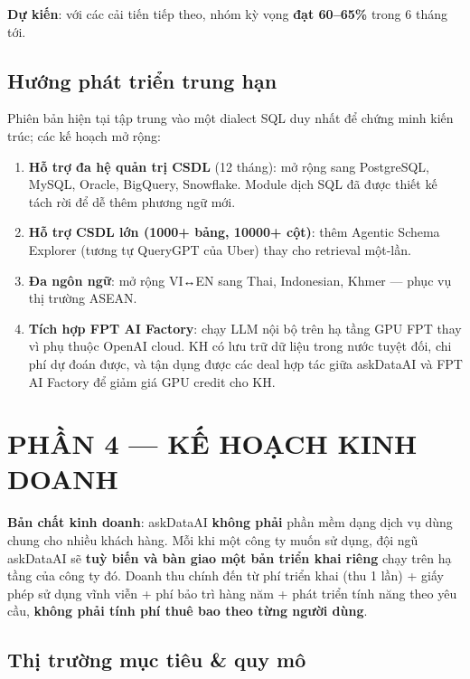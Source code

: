 \documentclass[11pt,a4paper]{article}
\begin{document}
\textbf{Dự kiến}: với các cải tiến tiếp theo, nhóm kỳ vọng \textbf{đạt 60--65\%} trong 6 tháng tới.

\subsection{Hướng phát triển trung hạn}

Phiên bản hiện tại tập trung vào một dialect SQL duy nhất để chứng minh kiến trúc; các kế hoạch mở rộng:

\begin{enumerate}
\item \textbf{Hỗ trợ đa hệ quản trị CSDL} (12 tháng): mở rộng sang PostgreSQL, MySQL, Oracle, BigQuery, Snowflake. Module dịch SQL đã được thiết kế tách rời để dễ thêm phương ngữ mới.
\item \textbf{Hỗ trợ CSDL lớn (1000+ bảng, 10000+ cột)}: thêm Agentic Schema Explorer (tương tự QueryGPT của Uber) thay cho retrieval một-lần.
\item \textbf{Đa ngôn ngữ}: mở rộng VI↔EN sang Thai, Indonesian, Khmer --- phục vụ thị trường ASEAN.
\item \textbf{Tích hợp FPT AI Factory}: chạy LLM nội bộ trên hạ tầng GPU FPT thay vì phụ thuộc OpenAI cloud. KH có lưu trữ dữ liệu trong nước tuyệt đối, chi phí dự đoán được, và tận dụng được các deal hợp tác giữa askDataAI và FPT AI Factory để giảm giá GPU credit cho KH.
\end{enumerate}

\newpage
\section{PHẦN 4 --- KẾ HOẠCH KINH DOANH}

\begin{tcolorbox}[notebox]
\textbf{Bản chất kinh doanh}: askDataAI \textbf{không phải} phần mềm dạng dịch vụ dùng chung cho nhiều khách hàng. Mỗi khi một công ty muốn sử dụng, đội ngũ askDataAI sẽ \textbf{tuỳ biến và bàn giao một bản triển khai riêng} chạy trên hạ tầng của công ty đó. Doanh thu chính đến từ phí triển khai (thu 1 lần) + giấy phép sử dụng vĩnh viễn + phí bảo trì hàng năm + phát triển tính năng theo yêu cầu, \textbf{không phải tính phí thuê bao theo từng người dùng}.
\end{tcolorbox}

\subsection{Thị trường mục tiêu \& quy mô}
\end{document}
